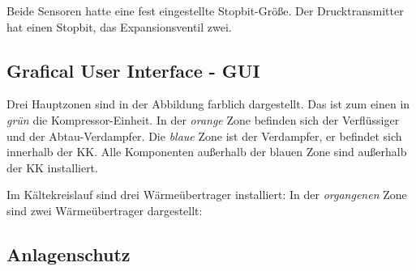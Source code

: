 Beide Sensoren hatte eine fest eingestellte Stopbit-Größe. Der Drucktransmitter hat einen Stopbit, das Expansionsventil zwei.

\subsection{Grafical User Interface - GUI}
\label{subsec:GUI}


Drei Hauptzonen sind in der Abbildung farblich dargestellt. Das ist zum einen in \textit{grün} die Kompressor-Einheit. In der \textit{orange} Zone befinden sich der Verflüssiger und der Abtau-Verdampfer. Die \textit{blaue} Zone ist der Verdampfer, er befindet sich innerhalb der KK. Alle Komponenten außerhalb der blauen Zone sind außerhalb der KK installiert. 

Im Kältekreislauf sind drei Wärmeübertrager installiert: In der \textit{organgenen} Zone sind zwei Wärmeübertrager dargestellt:

\subsection{Anlagenschutz}
\label{subsec: Anlagenschutz}